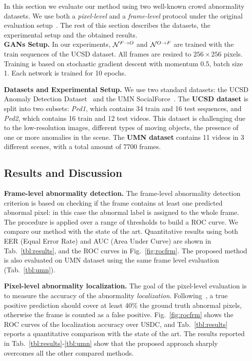 \documentclass{article}
\begin{document}
	In this section we evaluate our method using two well-known crowd abnormality datasets. We use both a {\em pixel-level} and a {\em frame-level} protocol under the original evaluation setup~\cite{li2014anomaly}. The rest of this section describes the datasets, the experimental setup and the obtained results.\\
	\noindent\textbf{GANs Setup.}
	In our experiments, ${\cal N}^{F \rightarrow O}$ and ${\cal N}^{O \rightarrow F}$ are trained with the train sequences of the UCSD dataset. All frames are resized to $256 \times 256$ pixels. Training is based on stochastic gradient descent with momentum 0.5, batch size 1. Each network is trained for 10 epochs.
	
	\noindent\textbf{Datasets and Experimental Setup.}
	We use two standard datasets: the UCSD Anomaly Detection Dataset~\cite{Mahadevan.anomaly.2010} and the UMN SocialForce~\cite{mehran2009abnormal}. The \textbf{UCSD dataset} is split into two subsets: {\em Ped1}, which contains 34 train and 16 test sequences, and {\em Ped2}, which contains 16 train and 12 test videos. This dataset is challenging due to the low-resolution images, different types of moving objects, the presence of one or more anomalies in the scene. The \textbf{UMN dataset} contains 11 videos in 3 different scenes, with a total amount of 7700 frames. 
\subsection{Results and Discussion}
\noindent\textbf{Frame-level abnormality detection.}
The frame-level abnormality detection criterion is based on checking if the frame contains at least one predicted abnormal pixel: in this case the abnormal label is assigned to the whole frame. The procedure is applied over a range of thresholds to build a ROC curve. We compare our method with the state of the art. Quantitative results using both EER (Equal Error Rate) and AUC (Area Under Curve) are shown in Tab.~\ref{tbl:results}, and the ROC curves in Fig.~\ref{fig:rocfrm}.
	The proposed method is also evaluated on UMN dataset using the same frame level evaluation (Tab.~\ref{tbl:umn}). 

	\noindent\textbf{Pixel-level abnormality localization.}
	The goal of the pixel-level evaluation is to measure the accuracy of the abnormality {\em localization}. Following~\cite{li2014anomaly}, a true positive prediction should cover at least 40\% the ground truth abnormal pixels, otherwise the frame is counted as a false positive. Fig.~\ref{fig:rocfrm} shows the ROC curves of the localization accuracy over USDC, and Tab.~\ref{tbl:results} reports a quantitative comparison with the state of the art. The results reported in Tab.~\ref{tbl:results}-\ref{tbl:umn} show that the proposed approach sharply overcomes all the other compared methods.	
	
\end{document}
